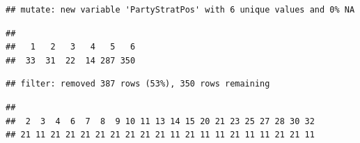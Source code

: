 \documentclass[
]{article}
\newenvironment{Shaded}{\begin{snugshade}}{\end{snugshade}}
\newcommand{\CommentTok}[1]{\textcolor[rgb]{0.56,0.35,0.01}{\textit{#1}}}
\newcommand{\DataTypeTok}[1]{\textcolor[rgb]{0.13,0.29,0.53}{#1}}
\newcommand{\DecValTok}[1]{\textcolor[rgb]{0.00,0.00,0.81}{#1}}
\newcommand{\KeywordTok}[1]{\textcolor[rgb]{0.13,0.29,0.53}{\textbf{#1}}}
\newcommand{\NormalTok}[1]{#1}
\newcommand{\OperatorTok}[1]{\textcolor[rgb]{0.81,0.36,0.00}{\textbf{#1}}}
\newcommand{\StringTok}[1]{\textcolor[rgb]{0.31,0.60,0.02}{#1}}
\begin{document}
\begin{verbatim}
## mutate: new variable 'PartyStratPos' with 6 unique values and 0% NA
\end{verbatim}

\begin{Shaded}
\end{Shaded}

\begin{verbatim}
## 
##   1   2   3   4   5   6 
##  33  31  22  14 287 350
\end{verbatim}

\begin{Shaded}
\end{Shaded}

\begin{verbatim}
## filter: removed 387 rows (53%), 350 rows remaining
\end{verbatim}

\begin{Shaded}
\end{Shaded}

\begin{verbatim}
## 
##  2  3  4  6  7  8  9 10 11 13 14 15 20 21 23 25 27 28 30 32 
## 21 11 21 21 21 21 21 21 21 21 11 21 11 11 21 11 11 21 21 11
\end{verbatim}

\begin{Shaded}
\end{Shaded}
\end{document}
